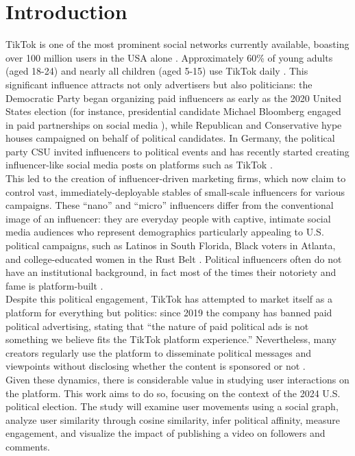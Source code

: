 \section*{Introduction}
TikTok is one of the most prominent social networks currently available, boasting over 100 million users in the USA alone \cite{tktkStat}. Approximately 60\% of young adults (aged 18-24) and nearly all children (aged 5-15) use TikTok daily \cite{https://doi.org/10.1002/poi3.287}. This significant influence attracts not only advertisers but also politicians: the Democratic Party began organizing paid influencers as early as the 2020 United States election (for instance, presidential candidate Michael Bloomberg engaged in paid partnerships on social media \cite{10.3389/fcomm.2021.752656}), while Republican and Conservative hype houses campaigned on behalf of political candidates. In Germany, the political party CSU invited influencers to political events and has recently started creating influencer-like social media posts on platforms such as TikTok \cite{10.3389/fcomm.2021.752656}.\\
This led to the creation of influencer-driven marketing firms, which now claim to control vast, immediately-deployable stables of small-scale influencers for various campaigns. These “nano” and “micro” influencers differ from the conventional image of an influencer: they are everyday people with captive, intimate social media audiences who represent demographics particularly appealing to U.S. political campaigns, such as Latinos in South Florida, Black voters in Atlanta, and college-educated women in the Rust Belt \cite{theHilltktk}. Political influencers often do not have an institutional background, in fact most of the times their notoriety and fame is platform-built \cite{doi:10.1177/20563051231177938}.\\
Despite this political engagement, TikTok has attempted to market itself as a platform for everything but politics: since 2019 the company has banned paid political advertising, stating that “the nature of paid political ads is not something we believe fits the TikTok platform experience.” Nevertheless, many creators regularly use the platform to disseminate political messages and viewpoints without disclosing whether the content is sponsored or not \cite{mozilla,politico}.\\
Given these dynamics, there is considerable value in studying user interactions on the platform. This work aims to do so, focusing on the context of the 2024 U.S. political election. The study will examine user movements using a social graph, analyze user similarity through cosine similarity, infer political affinity, measure engagement, and visualize the impact of publishing a video on followers and comments.